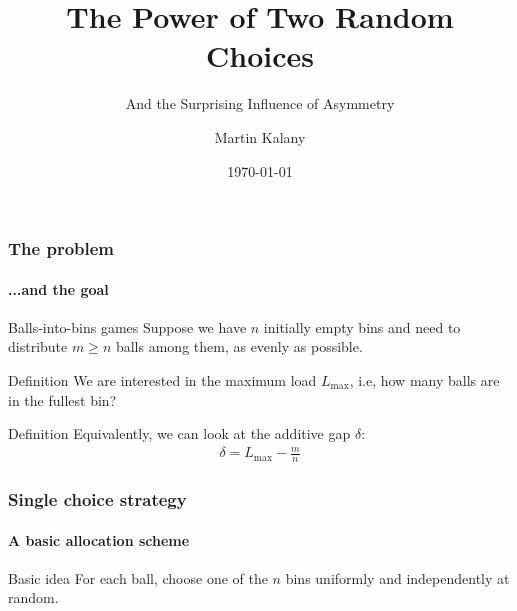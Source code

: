 \documentclass[serif,professionalfonts]{beamer}
\title{The Power of Two Random Choices}
\subtitle{And the Surprising Influence of Asymmetry}
\author[M. Kalany]{Martin Kalany}
\institute[TU Wien]
{
  Graduate student in Computer Science\\
  Vienna University of Technology\\
}
\date{\today}
\newcommand\load{L_{\mathrm{max}}}
\newcommand\scalefac{0.55}
\newcommand\ballsize{5mm}
\newcommand\nrbins{6}
\newcommand\padding{0.1*\ballsize}
\newcommand\bingap{1.6*\balldiameter}
\newcommand\balldiameter{2*\ballsize}
\newcommand\iA[2][0]{
	\path (\nbid) edge[insert, bend left=#1] (#2);
}
\newcommand\bin[1]{
	\path node[topflat, xshift=#1*\bingap*\scalefac, above, yshift=-\padding*\scalefac]  {};
}
\newcommand\bins{
	\foreach \ibin in {1,...,\nrbins}
		\bin{\ibin};
}
\newcommand\setNode[2]{
	\draw let \n1 ={#1#2} in node[circle, minimum size = \ballsize](n\n1) at (#1*\bingap,#2*\balldiameter-\ballsize) {};
}
\newcommand\nodes{
	\foreach \i in {1,...,6}
		\foreach \j in {1,...,5}
			\setNode{\i}{\j};
}
\newcommand\ball[2]{
	\shade[ballstyle] (#1*\bingap,#2*\balldiameter-\ballsize) circle (\ballsize) {};
}
\newcommand\nbid{nb}
\newcommand\newball{
	\draw node[circle, minimum size = \ballsize](\nbid) at (0*\bingap,6*\balldiameter-\ballsize) {};
	\ball{0}{6};
}
\newcommand\putinbin[2]{
	\ifnum #2 > 0
		\foreach \nrballs in {1,...,#2}
 			\ball{#1}{\nrballs};
 	\fi
}
\newcounter{index}
\newcommand\balls[1]{%
	\getargsC{#1}%
  	\setcounter{index}{0}%
  	\whiledo{\theindex < \narg}{%
    		\stepcounter{index}%
    		\putinbin{\theindex}{\csname arg\romannumeral\theindex\endcsname}%
  	}%
}
\newcommand\bab[1]{%
	\bins
	\nodes
	\balls{#1}
}
\begin{document}
\begin{frame}
  \titlepage
\end{frame}

\begin{frame}
\frametitle{The problem}
\framesubtitle{...and the goal}
\begin{exampleblock}{Balls-into-bins games}
Suppose we have $n$ initially empty bins and need to distribute $m \geq n$ balls among them, \alert{as evenly as possible}. 
\end{exampleblock}
\pause
\begin{exampleblock}{Definition}
We are interested in the \alert{maximum load $\load$}, i.e, how many balls are in the fullest bin?
\end{exampleblock}

\begin{exampleblock}{Definition}
Equivalently, we can look at the \alert{additive gap} $\delta$:
\begin{align*}
\delta = \load - \frac{m}{n}
\end{align*}
\end{exampleblock}
\end{frame}

\begin{frame}
\frametitle{Single choice strategy}
\framesubtitle{A basic allocation scheme}
\begin{exampleblock}{Basic idea}
For each ball, choose one of the $n$ bins \alert{uniformly and independently at random}.
\end{exampleblock}
\bigskip

\begin{center}
\end{center}
\end{frame}
\end{document}
